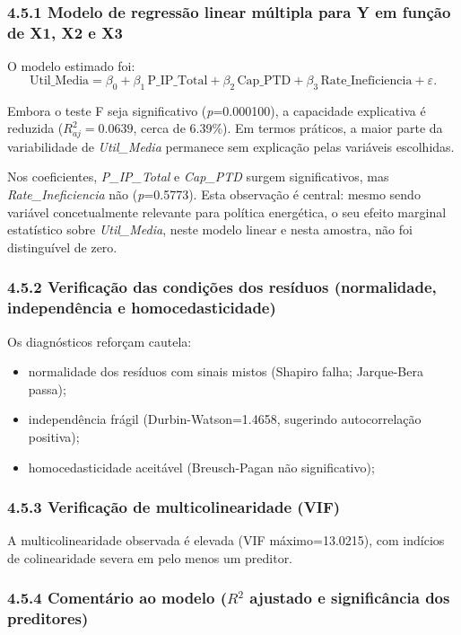 \subsubsection{4.5.1 Modelo de regressão linear múltipla para Y em função de X1, X2 e X3}

O modelo estimado foi:
\[
\text{Util\_Media} = \beta_0 + \beta_1\,\text{P\_IP\_Total} + \beta_2\,\text{Cap\_PTD} + \beta_3\,\text{Rate\_Ineficiencia} + \varepsilon.
\]

Embora o teste F seja significativo (\textit{p}=0.000100), a capacidade explicativa é reduzida (\(R^2_{aj}=0.0639\), cerca de 6.39\%). Em termos práticos, a maior parte da variabilidade de \textit{Util\_Media} permanece sem explicação pelas variáveis escolhidas.

Nos coeficientes, \textit{P\_IP\_Total} e \textit{Cap\_PTD} surgem significativos, mas \textit{Rate\_Ineficiencia} não (\textit{p}=0.5773). Esta observação é central: mesmo sendo variável concetualmente relevante para política energética, o seu efeito marginal estatístico sobre \textit{Util\_Media}, neste modelo linear e nesta amostra, não foi distinguível de zero.

\subsubsection{4.5.2 Verificação das condições dos resíduos (normalidade, independência e homocedasticidade)}

Os diagnósticos reforçam cautela:
\begin{itemize}
\item normalidade dos resíduos com sinais mistos (Shapiro falha; Jarque-Bera passa);
\item independência frágil (Durbin-Watson=1.4658, sugerindo autocorrelação positiva);
\item homocedasticidade aceitável (Breusch-Pagan não significativo);
\end{itemize}

\subsubsection{4.5.3 Verificação de multicolinearidade (VIF)}

A multicolinearidade observada é elevada (VIF máximo=13.0215), com indícios de colinearidade severa em pelo menos um preditor.

\subsubsection{4.5.4 Comentário ao modelo (\(R^2\) ajustado e significância dos preditores)}

